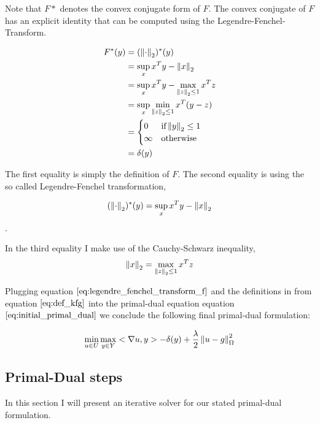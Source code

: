Note that $F*$ denotes the convex conjugate form of $F$. The convex conjugate of $F$ has an explicit identity that can be computed using the Legendre-Fenchel-Transform.

\begin{align}
	F^*(y) &= (\left\lVert\cdot\right\rVert_2)^*(y) \nonumber \\
		  &= \sup_x x^T y - \left\lVert x\right\rVert_2 \nonumber \\
		  &= \sup_x x^T y - \max_{\left\lVert z\right\rVert_2 \leq 1} x^T z \nonumber \\
		  &= \sup_x \min_{\left\lVert z\right\rVert_2 \leq 1} x^T(y-z) \nonumber \\
		  &= \begin{cases}
   				0  			& \text{if} \left\lVert y\right\rVert_2 \leq 1 \\
   				\infty      & \text{otherwise}
  			 \end{cases} \nonumber \\
  		  &= \delta(y)
\label{eq:legendre_fenchel_transform_f}  		  
\end{align}

The first equality is simply the definition of $F$. The second equality is using the so called Legendre-Fenchel transformation,

\begin{equation}
	(\left\lVert\cdot\right\rVert_2)^*(y) = \sup_x x^T y - \left\lVert x\right\rVert_2 \nonumber
\end{equation}. 

In the third equality I make use of the Cauchy-Schwarz inequality, 
\begin{equation}
	\left\lVert x\right\rVert_2 = \max_{\left\lVert z\right\rVert_2 \leq 1} x^T z
\end{equation}


Plugging equation $\ref{eq:legendre_fenchel_transform_f}$ and the definitions in from equation $\ref{eq:def_kfg}$ into the primal-dual equation equation $\ref{eq:initial_primal_dual}$ we conclude the following final primal-dual formulation:

\begin{equation}
\min_{u \in U} \max_{y \in Y} <\nabla u, y> - \delta(y) + \frac{\lambda}{2}\left\lVert u - g\right\rVert^2_{\Omega}
\label{eq:final_primal_dual}
\end{equation}


\subsection{Primal-Dual steps}
In this section I will present an iterative solver for our stated primal-dual formulation.

